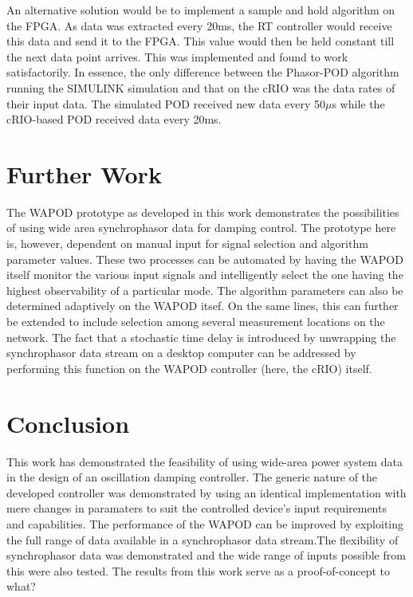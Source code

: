 \documentclass[journal]{IEEEtran}
\begin{document}
An alternative solution would be to implement a sample and hold algorithm on the FPGA. As data was extracted every 20ms, the RT controller would receive this data and send it to the FPGA. This value would then be held constant till the next data point arrives. This was implemented and found to work satisfactorily. In essence, the only difference between the Phasor-POD algorithm running the SIMULINK simulation and that on the cRIO was the data rates of their input data. The simulated POD received new data every 50$\mu$s while the cRIO-based POD received data every 20ms.


\section{Further Work}

The WAPOD prototype as developed in this work demonstrates the possibilities of using wide area synchrophasor data for damping control. The prototype here is, however, dependent on manual input for signal selection and algorithm parameter values. These two processes can be automated by having the WAPOD itself monitor the various input signals and intelligently select the one having the highest observability of a particular mode. The algorithm parameters can also be determined adaptively on the WAPOD itsef. On the same lines, this can further be extended to include selection among several measurement locations on the network. The fact that a stochastic time delay is introduced by unwrapping the synchrophasor data stream on a desktop computer can be addressed by performing this function on the WAPOD controller (here, the cRIO) itself.

\section{Conclusion}
This work has demonstrated the feasibility of using wide-area power system data in the design of an oscillation damping controller. The generic nature of the developed controller was demonstrated by using an identical implementation with mere changes in paramaters to suit the controlled device's input requirements and capabilities. The performance of the WAPOD can be improved by exploiting the full range of data available in a synchrophasor data stream.The flexibility of synchrophasor data was demonstrated and the wide range of inputs possible from this were also tested. The results from this work serve as a proof-of-concept to what?
\end{document}
